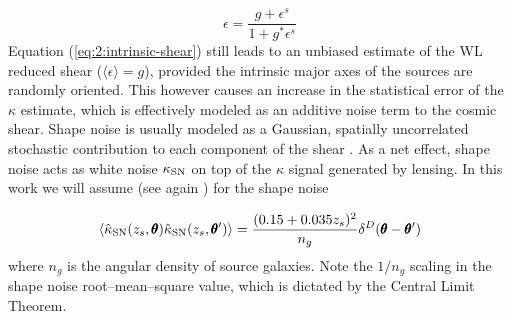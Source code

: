 \begin{equation}
\label{eq:2:intrinsic-shear}
\epsilon = \frac{g+\epsilon^s}{1+g^*\epsilon^s}
\end{equation}
%
Equation (\ref{eq:2:intrinsic-shear}) still leads to an unbiased estimate of the WL reduced shear ($\langle\epsilon\rangle=g$), provided the intrinsic major axes of the sources are randomly oriented. This however causes an increase in the statistical error of the $\kappa$ estimate, which is effectively modeled as an additive noise term to the cosmic shear. Shape noise is usually modeled as a Gaussian, spatially uncorrelated stochastic contribution to each component of the shear \citep{SongKnox}. As a net effect, shape noise acts as white noise $\kappa_{\rm SN}$ on top of the $\kappa$ signal generated by lensing. In this work we will assume (see again \citep{SongKnox}) for the shape noise

\begin{equation}
\label{eq:2:shapenoise}
\left\langle\hat{\kappa}_{\rm SN}(z_s,\pmb{\theta})\hat{\kappa}_{\rm SN}(z_s,\pmb{\theta}')\right\rangle = \frac{(0.15+0.035z_s)^2}{n_g}\delta^D(\pmb{\theta}-\pmb{\theta}')
\end{equation} 
%
where $n_g$ is the angular density of source galaxies. Note the $1/n_g$ scaling in the shape noise root--mean--square value, which is dictated by the Central Limit Theorem.    

%